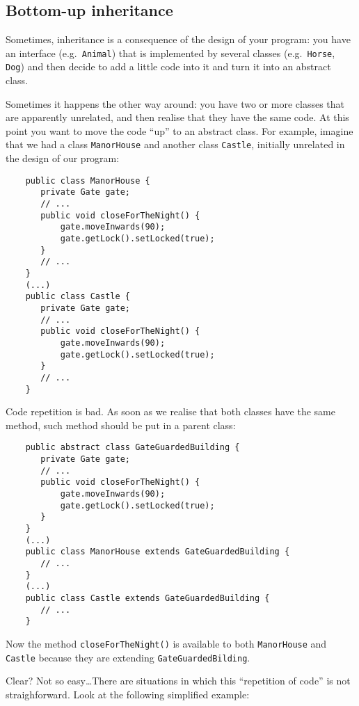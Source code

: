 \subsection{Bottom-up inheritance}
\label{sec:boot-up-inher}

Sometimes, inheritance is a consequence of the design of your
program: you have an interface (e.g.~\verb+Animal+) 
that is implemented by several classes (e.g.~\verb+Horse+, \verb+Dog+)
and then decide to add a little code into it and turn it into an
abstract class. 

Sometimes it happens the other way around: you have two or
more classes that are apparently unrelated, and then realise that they
have the same code. At this point you want to move the code ``up'' to
an abstract class. For example, imagine that we had a class
\verb+ManorHouse+ and another class \verb+Castle+, initially unrelated
in the design of our program: 

\begin{verbatim}
    public class ManorHouse {
       private Gate gate;
       // ...
       public void closeForTheNight() {
           gate.moveInwards(90);
           gate.getLock().setLocked(true);
       }
       // ...
    }
    (...)
    public class Castle {
       private Gate gate;
       // ...
       public void closeForTheNight() {
           gate.moveInwards(90);
           gate.getLock().setLocked(true);
       }
       // ...
    }       
\end{verbatim}

Code repetition is bad. As soon as we realise that both classes have
the same method, such method should be put in a parent class: 

\begin{verbatim}
    public abstract class GateGuardedBuilding {
       private Gate gate;
       // ...
       public void closeForTheNight() {
           gate.moveInwards(90);
           gate.getLock().setLocked(true);
       }
    }
    (...)
    public class ManorHouse extends GateGuardedBuilding {
       // ...
    }
    (...)
    public class Castle extends GateGuardedBuilding {
       // ...
    }       
\end{verbatim}

Now the method \verb+closeForTheNight()+ is available to both
\verb+ManorHouse+ and \verb+Castle+ because they are extending
\verb+GateGuardedBilding+. 

Clear? Not so easy\ldots There are situations in which 
this ``repetition of code'' is not straighforward. Look at the
following simplified example:  

